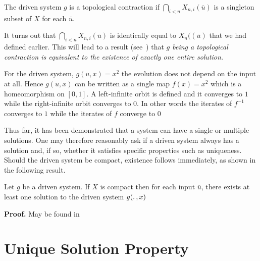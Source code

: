 \begin{Definition}
  \label{Dfn_topContr}\rm
  The driven system $g$ is a topological contraction if $\bigcap_{i<n}X_{n,i}(\overline{u})$ is a singleton subset of $X$ for each $\overline{u}$. 
\end{Definition}

It turns out that $\bigcap_{i<n}X_{n,i}(\overline{u})$ is identically equal to $X_n((\overline{u})$ that we had defined earlier. This will lead to a result (see~\cite{manjunath2013echo}) that 
\textit{$g$ being a topological contraction is equivalent to the existence of exactly one entire solution.}

\begin{Remark}
  \label{rem_proofEx} \rm
  For the driven system,  
  $g(u,x)=x^2$ the evolution does not depend on the input at all. Hence $g(u,x)$ can be written as a single map $f(x)=x^2$ which is a homeomorphism on $[0,1]$. 
  A left-infinite orbit is defined and it converges to $1$ while the right-infinite orbit converges to $0$. 
  In other words the iterates of $f^{-1}$ converges to $1$ while the iterates of $f$ converge to $0$ 
\end{Remark}

Thus far, it has been demonstrated that a system can have a single or multiple solutions. One may therefore reasonably ask if a driven system always has a solution and, if so, whether it satisfies specific properties such as uniqueness. 
Should the driven system be compact, existence follows immediately, as shown in the following result.

\begin{Theorem}\label{Thm_CompactExistence}
 Let $g$ be a driven system.  If $X$ is compact then for each input $\overline{u}$, there exists at least one solution to the driven system $g(\ldotp, x)$
\end{Theorem}
\vspace{-6mm}
{\bf Proof.} May be found in~\cite{kloeden2011nonautonomous, manjunath2014dynamics, manjunath2013echo}


\section{Unique Solution Property}

